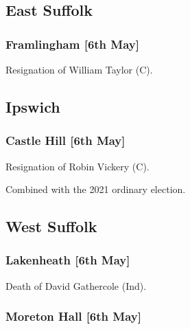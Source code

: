 \documentclass[a4paper,openany]{book}
\begin{document}
\begin{resultsiii}
\subsection*{East Suffolk}

\subsubsection*{Framlingham \hspace*{\fill}\nolinebreak[1]%
	\enspace\hspace*{\fill}
	[6th May]}


Resignation of William Taylor (C).

\subsection*{Ipswich}

\subsubsection*{Castle Hill \hspace*{\fill}\nolinebreak[1]%
	\enspace\hspace*{\fill}
	[6th May]}


Resignation of Robin Vickery (C).

Combined with the 2021 ordinary election.

\subsection*{West Suffolk}

\subsubsection*{Lakenheath \hspace*{\fill}\nolinebreak[1]%
	\enspace\hspace*{\fill}
	[6th May]}


Death of David Gathercole (Ind).

\subsubsection*{Moreton Hall \hspace*{\fill}\nolinebreak[1]%
	\enspace\hspace*{\fill}
	[6th May]}


\end{resultsiii}
\end{document}
